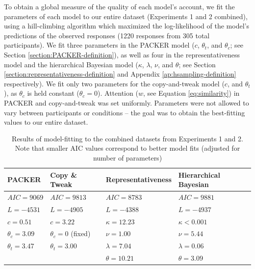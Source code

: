 \documentclass[pdflatex,sn-apa]{sn-jnl}%
\theoremstyle{thmstyleone}%
\theoremstyle{thmstyletwo}%
\theoremstyle{thmstylethree}%
\begin{document}
To obtain a global measure of the quality of each model's account, we fit the
parameters of each model to our entire dataset (Experiments 1 and 2 combined),
using a hill-climbing algorithm which maximized the log-likelihood of the
model's predictions of the observed responses (1220 responses from 305 total
participants). We fit three parameters in the PACKER model ($c$, $\theta_t$,
and $\theta_c$; see Section \ref{section:PACKER-definition}), as well as four in
the representativeness model and the hierarchical Bayesian model ($\kappa$,
$\lambda$, $\nu$, and $\theta$; see Section
\ref{section:representativeness-definition} and Appendix
\ref{ap:hsampling-definition} respectively). We fit only two parameters for
the copy-and-tweak model ($c$, and $\theta_t$), as $\theta_c$ is held constant
($\theta_c = 0$). Attention ($w$, see Equation \ref{eq:similarity}) in PACKER
and copy-and-tweak was set uniformly. Parameters were not allowed to vary
between participants or conditions -- the goal was to obtain the best-fitting
values to our entire dataset.

\begin{table} \centering
\caption{Results of model-fitting to the combined datasets from Experiments 1
and 2. Note that smaller AIC values correspond to better model fits (adjusted
for number of parameters)}
\label{table:global-model-fits}
\begin{tabular}{ l l l l} \\ \textbf{PACKER} & \textbf{Copy \& Tweak} &
\textbf{Representativeness} & \textbf{Hierarchical Bayesian} \\ \hline $AIC =
  9069$ & $AIC = 9813$ & $AIC = 8783$ &  $AIC =
9881$ \\ $L = -4531$ & $L = -4905$ & $L = -4388$ & $L = -4937$ \\ $c = 0.51$ &
                                                                                $c = 3.22$ & $\kappa = 12.23$ &
$\kappa < 0.001$ \\ $\theta_c = 3.09$ & $\theta_c = 0$ (fixed) & $\nu = 1.00$ & $\nu = 5.44$ \\
$\theta_t = 3.47$ & $\theta_t = 3.00$ & $\lambda = 7.04$& $\lambda
                                                                       = 0.06$
  \\ & &$\theta = 10.21 $& $\theta = 3.09$
\\
\end{tabular}
\end{table}
\end{document}
